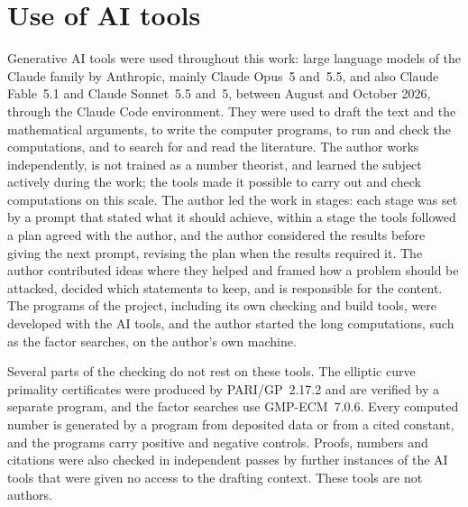 %
%
%
%
%
%
%
%
%
\section*{Use of AI tools}

Generative AI tools were used throughout this work: large language models of the Claude family by Anthropic, mainly Claude Opus~5 and~5.5,
and also Claude Fable~5.1 and Claude Sonnet~5.5 and~5, between August and October 2026,
through the Claude Code environment. They were used to draft the text and the mathematical arguments, to write the computer programs, to
run and check the computations, and to search for and read the literature. The author works independently, is not trained as a number
theorist, and learned the subject actively during the work; the tools made it possible to carry out and check computations on this scale. The author led the work in stages: each stage was
set by a prompt that stated what it should achieve, within a stage the tools followed a plan agreed with the author, and the author considered
the results before giving the next prompt, revising the plan when the results required it. The author contributed ideas where they helped and
framed how a problem should be attacked, decided which statements to keep, and is responsible for the content. The programs of the project,
including its own checking and build tools, were developed with the AI tools, and the author started the long computations, such as the
factor searches, on the author's own machine.

Several parts of the checking do not rest on these tools. The elliptic curve primality certificates were produced by PARI/GP~2.17.2 and are
verified by a separate program, and the factor searches use GMP-ECM~7.0.6. Every computed number is generated by a program from deposited
data or from a cited constant, and the programs carry positive and negative controls. Proofs, numbers and citations were also checked in
independent passes by further instances of the AI tools that were given no access to the drafting context. These tools are not authors.
